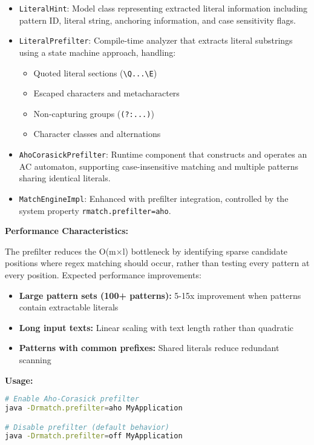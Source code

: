 \documentclass[11pt,a4paper]{article}
\begin{document}
\begin{itemize}
\item \texttt{LiteralHint}: Model class representing extracted literal information including pattern ID, literal string, anchoring information, and case sensitivity flags.

\item \texttt{LiteralPrefilter}: Compile-time analyzer that extracts literal substrings using a state machine approach, handling:
  \begin{itemize}
  \item Quoted literal sections (\texttt{\textbackslash Q...\textbackslash E})
  \item Escaped characters and metacharacters  
  \item Non-capturing groups (\texttt{(?:...)})
  \item Character classes and alternations
  \end{itemize}

\item \texttt{AhoCorasickPrefilter}: Runtime component that constructs and operates an AC automaton, supporting case-insensitive matching and multiple patterns sharing identical literals.

\item \texttt{MatchEngineImpl}: Enhanced with prefilter integration, controlled by the system property \texttt{rmatch.prefilter=aho}.
\end{itemize}

\textbf{Performance Characteristics:}

The prefilter reduces the O(m×l) bottleneck by identifying sparse candidate positions where regex matching should occur, rather than testing every pattern at every position. Expected performance improvements:

\begin{itemize}
\item \textbf{Large pattern sets (100+ patterns):} 5-15x improvement when patterns contain extractable literals
\item \textbf{Long input texts:} Linear scaling with text length rather than quadratic 
\item \textbf{Patterns with common prefixes:} Shared literals reduce redundant scanning
\end{itemize}

\textbf{Usage:}

\begin{lstlisting}[language=bash,caption=Enabling the prefilter]
# Enable Aho-Corasick prefilter
java -Drmatch.prefilter=aho MyApplication

# Disable prefilter (default behavior) 
java -Drmatch.prefilter=off MyApplication
\end{lstlisting}
\end{document}
